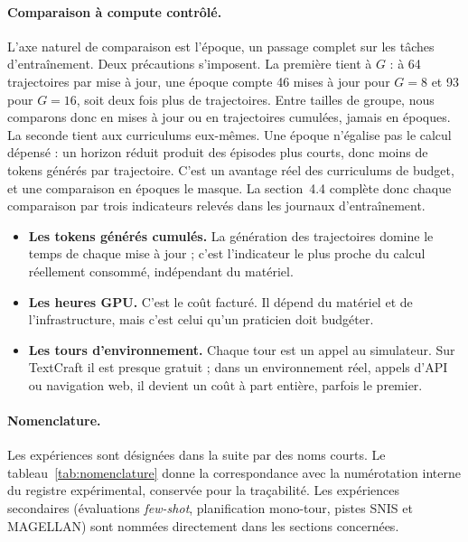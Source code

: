 \documentclass[11pt,a4paper]{article}
\begin{document}
\paragraph{Comparaison à compute contrôlé.} L'axe naturel de comparaison est l'époque, un passage complet sur les tâches d'entraînement. Deux précautions s'imposent. La première tient à $G$ : à 64 trajectoires par mise à jour, une époque compte 46 mises à jour pour $G=8$ et 93 pour $G=16$, soit deux fois plus de trajectoires. Entre tailles de groupe, nous comparons donc en mises à jour ou en trajectoires cumulées, jamais en époques. La seconde tient aux curriculums eux-mêmes. Une époque n'égalise pas le calcul dépensé : un horizon réduit produit des épisodes plus courts, donc moins de tokens générés par trajectoire. C'est un avantage réel des curriculums de budget, et une comparaison en époques le masque. La section~4.4 complète donc chaque comparaison par trois indicateurs relevés dans les journaux d'entraînement.

\begin{itemize}
    \item \textbf{Les tokens générés cumulés.} La génération des trajectoires domine le temps de chaque mise à jour ; c'est l'indicateur le plus proche du calcul réellement consommé, indépendant du matériel.
    \item \textbf{Les heures GPU.} C'est le coût facturé. Il dépend du matériel et de l'infrastructure, mais c'est celui qu'un praticien doit budgéter.
    \item \textbf{Les tours d'environnement.} Chaque tour est un appel au simulateur. Sur TextCraft il est presque gratuit ; dans un environnement réel, appels d'API ou navigation web, il devient un coût à part entière, parfois le premier.
\end{itemize}

\paragraph{Nomenclature.} Les expériences sont désignées dans la suite par des noms courts. Le tableau~\ref{tab:nomenclature} donne la correspondance avec la numérotation interne du registre expérimental, conservée pour la traçabilité. Les expériences secondaires (évaluations \emph{few-shot}, planification mono-tour, pistes SNIS et MAGELLAN) sont nommées directement dans les sections concernées.
\end{document}

